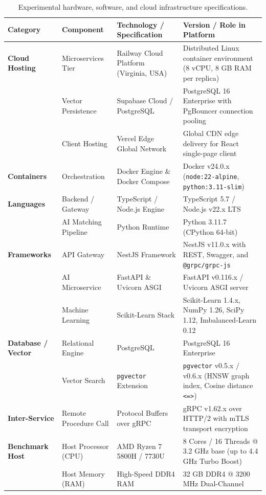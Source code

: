 \documentclass[a4paper,fleqn]{cas-dc}
\begin{document}
\begin{table}[t]
\caption{Experimental hardware, software, and cloud infrastructure specifications.}
\label{tbl:infrastructure}
\centering
\footnotesize
\setlength{\tabcolsep}{5pt}
\begin{tabularx}{\textwidth}{@{}l p{3.2cm} p{3.8cm} X@{}}
\toprule
\textbf{Category} & \textbf{Component} & \textbf{Technology / Specification} & \textbf{Version / Role in Platform} \\
\midrule
\textbf{Cloud Hosting} & Microservices Tier & Railway Cloud Platform (Virginia, USA) & Distributed Linux container environment (8 vCPU, 8 GB RAM per replica) \\
 & Vector Persistence & Supabase Cloud / PostgreSQL & PostgreSQL 16 Enterprise with PgBouncer connection pooling \\
 & Client Hosting & Vercel Edge Global Network & Global CDN edge delivery for React single-page client \\
\textbf{Containers} & Orchestration & Docker Engine \& Docker Compose & Docker v24.0.x (\texttt{node:22-alpine}, \texttt{python:3.11-slim}) \\
\textbf{Languages} & Backend / Gateway & TypeScript / Node.js Engine & TypeScript 5.7 / Node.js v22.x LTS \\
 & AI Matching Pipeline & Python Runtime & Python 3.11.7 (CPython 64-bit) \\
\textbf{Frameworks} & API Gateway & NestJS Framework & NestJS v11.0.x with REST, Swagger, and \texttt{@grpc/grpc-js} \\
 & AI Microservice & FastAPI \& Uvicorn ASGI & FastAPI v0.116.x / Uvicorn ASGI server \\
 & Machine Learning & Scikit-Learn Stack & Scikit-Learn 1.4.x, NumPy 1.26, SciPy 1.12, Imbalanced-Learn 0.12 \\
\textbf{Database / Vector} & Relational Engine & PostgreSQL & PostgreSQL 16 Enterprise \\
 & Vector Search & \texttt{pgvector} Extension & \texttt{pgvector} v0.5.x / v0.6.x (HNSW graph index, Cosine distance \texttt{<=>}) \\
\textbf{Inter-Service} & Remote Procedure Call & Protocol Buffers over gRPC & gRPC v1.62.x over HTTP/2 with mTLS transport encryption \\
\textbf{Benchmark Host} & Host Processor (CPU) & AMD Ryzen 7 5800H / 7730U & 8 Cores / 16 Threads @ 3.2 GHz base (up to 4.4 GHz Turbo Boost) \\
 & Host Memory (RAM) & High-Speed DDR4 RAM & 32 GB DDR4 @ 3200 MHz Dual-Channel \\
\bottomrule
\end{tabularx}
\end{table}
\end{document}
